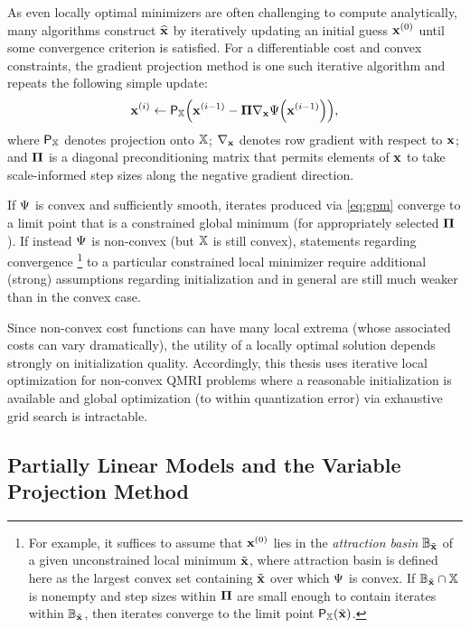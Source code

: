 As even locally optimal minimizers
are often challenging to compute analytically,
many algorithms construct $\widehat{\mathbf{x}}$ 
by iteratively updating
an initial guess $\bmxi{0}$
until some convergence criterion is satisfied.
For a differentiable cost
and convex constraints, 
the gradient projection method
\cite{rosen:60:tgp}
is one such iterative algorithm
and repeats the following simple update:
\begin{align}
	\bmxi{i} \gets \proja{\setX}{\bmxi{i-1}-\bmPi \grada{\bmx}\costa{\bmxi{i-1}}},
	\label{eq:gpm}
\end{align}
where $\mathsf{P}_{\mathbb{X}}$ denotes 
projection onto $\mathbb{X}$;
$\nabla_{\mathbf{x}}$ denotes
row gradient with respect to $\mathbf{x}$;
and $\boldsymbol{\Pi}$ is a diagonal preconditioning matrix
that permits elements of $\mathbf{x}$
to take scale-informed step sizes
along the negative gradient direction.

If $\Psi$ is convex and sufficiently smooth,
iterates produced via \eqref{eq:gpm} 
converge to a limit point \cite{byrne:04:aut}
that is a constrained global minimum
(for appropriately selected $\boldsymbol{\Pi}$).
If instead $\Psi$ is non-convex 
(but $\mathbb{X}$ is still convex),
statements regarding convergence
\footnote{For example, 
it suffices to assume
that $\bmxi{0}$ lies
in the \emph{attraction basin} $\mathbb{B}_{\tilde{\mathbf{x}}}$
of a given unconstrained local minimum $\tilde{\mathbf{x}}$, 
where attraction basin 
is defined here as the largest convex set
containing $\tilde{\mathbf{x}}$ 
over which $\Psi$ is convex.
If $\mathbb{B}_{\tilde{\mathbf{x}}} \cap \mathbb{X}$ is nonempty 
and step sizes within $\boldsymbol{\Pi}$ are small enough 
to contain iterates
within $\mathbb{B}_{\tilde{\mathbf{x}}}$,
then iterates converge
to the limit point $\proja{\setX}{\bmxt}$.
}
to a particular constrained local minimizer
require additional (strong) assumptions
regarding initialization
and in general 
are still much weaker 
than in the convex case.

Since non-convex cost functions
can have many local extrema
(whose associated costs can vary dramatically),
the utility of a locally optimal solution
depends strongly on initialization quality.
Accordingly,
this thesis uses iterative local optimization
for non-convex QMRI problems
where a reasonable initialization is available
and global optimization (to within quantization error) 
via exhaustive grid search
is intractable.

\subsection{Partially Linear Models and the Variable Projection Method}
\label{ss,bkgrd,opt,vpm}


